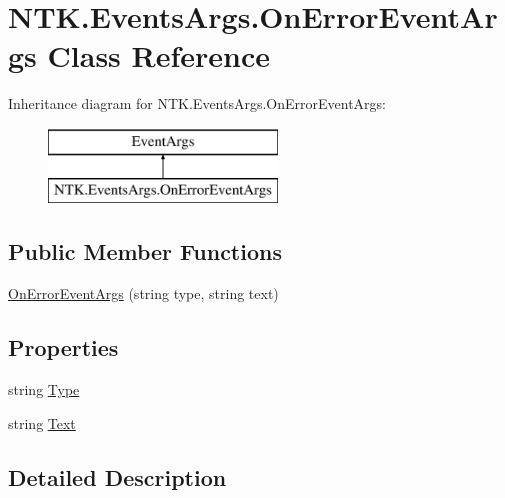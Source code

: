 \hypertarget{class_n_t_k_1_1_events_args_1_1_on_error_event_args}{}\section{N\+T\+K.\+Events\+Args.\+On\+Error\+Event\+Args Class Reference}
\label{class_n_t_k_1_1_events_args_1_1_on_error_event_args}
Inheritance diagram for N\+T\+K.\+Events\+Args.\+On\+Error\+Event\+Args\+:\begin{figure}[H]
\begin{center}
\leavevmode
\includegraphics[height=2.000000cm]{d9/dd1/class_n_t_k_1_1_events_args_1_1_on_error_event_args}
\end{center}
\end{figure}
\subsection*{Public Member Functions}
\begin{DoxyCompactItemize}
\item 
\mbox{\hyperlink{class_n_t_k_1_1_events_args_1_1_on_error_event_args_a3492f6238103781dbf5b32851227ca5b}{On\+Error\+Event\+Args}} (string type, string text)
\end{DoxyCompactItemize}
\subsection*{Properties}
\begin{DoxyCompactItemize}
\item 
string \mbox{\hyperlink{class_n_t_k_1_1_events_args_1_1_on_error_event_args_ab28ffedcb617e67f9ecd76a1194a0333}{Type}}
\item 
string \mbox{\hyperlink{class_n_t_k_1_1_events_args_1_1_on_error_event_args_abdbe9ab57a85cc2ed6b5332bdd356214}{Text}}
\end{DoxyCompactItemize}


\subsection{Detailed Description}


